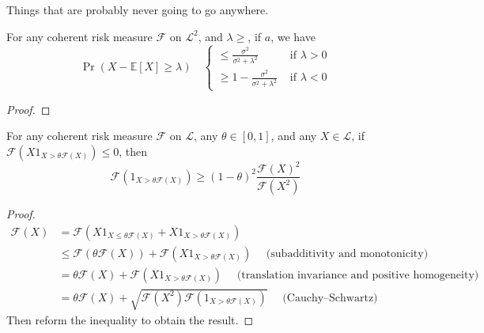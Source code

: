 Things that are probably never going to go anywhere.

\begin{prop}
	For any coherent risk measure $\mathcal{F}$ on $\mathscr{L}^2$, and $\lambda \ge $, if $a$, we have 
	\begin{equation}
	\operatorname{Pr}(X-\mathbb{E}[X] \geq \lambda) \quad\left\{\begin{array}{ll}{ \leq \frac{\sigma^{2}}{\sigma^{2}+\lambda^{2}}} & {\text { if } \lambda>0} \\ { \geq 1-\frac{\sigma^{2}}{\sigma^{2}+\lambda^{2}}} & {\text { if } \lambda<0}\end{array}\right.
	\end{equation}
\end{prop}
\begin{proof}
\end{proof}

\begin{prop}
	For any coherent risk measure $\mathcal{F}$ on $\mathscr{L}$, any $\theta \in [0, 1]$, and any $X\in \mathscr{L}$, if $\mathcal{F}(X1_{X > \theta\mathcal{F}(X)})\le 0$, then
	\begin{equation}
	\label{eq:pzineq_crm}
	\mathcal{F}(1_{X>\theta\mathcal{F}(X)}) \ge (1-\theta)^2 \frac{\mathcal{F}(X)^2}{\mathcal{F}(X^2)}
	\end{equation}
\end{prop}
\begin{proof}
	\begin{align*}
	\mathcal{F}(X) &= \mathcal{F}(X1_{X\le \theta\mathcal{F}(X)} + X1_{X > \theta\mathcal{F}(X)}) \\
	&\le \mathcal{F}(\theta\mathcal{F}(X)) + \mathcal{F}(X1_{X > \theta\mathcal{F}(X)}) \quad\text{ (subadditivity and monotonicity)}\\
	&= \theta\mathcal{F}(X) + \mathcal{F}(X1_{X > \theta\mathcal{F}(X)}) \quad\text{ (translation invariance and positive homogeneity)} \\
	&=  \theta\mathcal{F}(X) + \sqrt{\mathcal{F}(X^2)\mathcal{F}(1_{X > \theta\mathcal{F}(X)})} \quad\text{ (Cauchy--Schwartz)}
	\end{align*}
	Then reform the inequality to obtain the result.
\end{proof}



